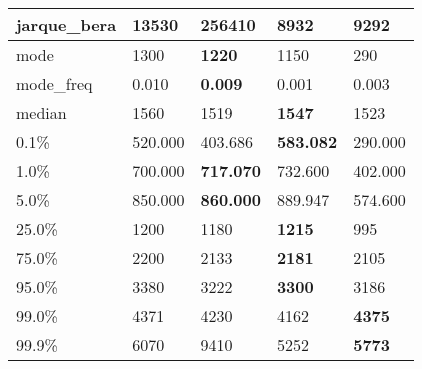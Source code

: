 \begin{table}[H]
\begin{tabular}{|l|m{10em}|m{10em}|m{10em}|m{10em}|}
\hline jarque\_bera & 13530 & \cellcolor[rgb]{0.9, 0.54, 0.52} 256410 & 8932 & \bfseries 9292 \\
\hline mode & 1300 & \bfseries 1220 & 1150 & \cellcolor[rgb]{0.9, 0.54, 0.52} 290 \\
\hline mode\_freq & 0.010 & \bfseries 0.009 & \cellcolor[rgb]{0.9, 0.54, 0.52} 0.001 & 0.003 \\
\hline median & 1560 & \cellcolor[rgb]{0.9, 0.54, 0.52} 1519 & \bfseries 1547 & 1523 \\
\hline 0.1\% & 520.000 & 403.686 & \bfseries 583.082 & \cellcolor[rgb]{0.9, 0.54, 0.52} 290.000 \\
\hline 1.0\% & 700.000 & \bfseries 717.070 & 732.600 & \cellcolor[rgb]{0.9, 0.54, 0.52} 402.000 \\
\hline 5.0\% & 850.000 & \bfseries 860.000 & 889.947 & \cellcolor[rgb]{0.9, 0.54, 0.52} 574.600 \\
\hline 25.0\% & 1200 & 1180 & \bfseries 1215 & \cellcolor[rgb]{0.9, 0.54, 0.52} 995 \\
\hline 75.0\% & 2200 & 2133 & \bfseries 2181 & \cellcolor[rgb]{0.9, 0.54, 0.52} 2105 \\
\hline 95.0\% & 3380 & 3222 & \bfseries 3300 & \cellcolor[rgb]{0.9, 0.54, 0.52} 3186 \\
\hline 99.0\% & 4371 & 4230 & \cellcolor[rgb]{0.9, 0.54, 0.52} 4162 & \bfseries 4375 \\
\hline 99.9\% & 6070 & \cellcolor[rgb]{0.9, 0.54, 0.52} 9410 & 5252 & \bfseries 5773 \\
\hline
\end{tabular}
\end{table}
